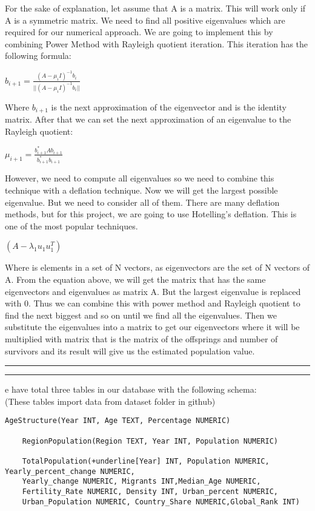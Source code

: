 \documentclass[a4paper, 11pt]{article}
\newcommand{\question}[2] {\vspace{.25in} \hrule\vspace{0.5em}
\noindent{\bf #1: #2} \vspace{0.5em}
\hrule \vspace{.10in}}
\begin{document}
 For the sake of explanation, let assume that A is a matrix. This will work only if A is a symmetric matrix. We need to find all positive eigenvalues which are required for our numerical approach. We are going to implement this by combining Power Method with Rayleigh quotient iteration. This iteration has the following formula:
 \begin{center}
     $b_{i+1} = \frac{(A-\mu_{i}I)^{-1}b_{i}}{||(A-\mu_{i}I)^{-1}b_{i}||} $ 
 \end{center}
Where $b_{i+1}$ is the next approximation of the eigenvector and  is the identity matrix. After that we can set the next approximation of an eigenvalue to the Rayleigh quotient:
 \begin{center}
$\mu_{i+1} = \frac{b^{*}_{i+1}Ab_{i+1}}{b^{*}_{i+1}b_{i+1}}$
 \end{center}
However, we need to compute all eigenvalues so we need to combine this technique with a deflation technique. Now we will get the largest possible eigenvalue. But we need to consider all of them. There are many deflation methods, but for this project, we are going to use Hotelling’s deflation. This is one of the most popular techniques.
 \begin{center}
$(A-\lambda_{1}u_{1}u_{1}^{T})$
\end{center}
Where  is elements in a set of N vectors, as eigenvectors are the set of N vectors of A. From the equation above, we will get the matrix that has the same eigenvectors and eigenvalues as matrix A. But the largest eigenvalue is replaced with 0. Thus we can combine this with power method and Rayleigh quotient to find the next biggest and so on until we find all the eigenvalues. Then we substitute the eigenvalues into a matrix to get our eigenvectors where it will be multiplied with  matrix that is the matrix of the offsprings and number of survivors and its result will give us the estimated population value.\\

\question{Database schema}

We have total three tables in our database with the following schema:\\
(These tables import data from dataset folder in github)
\begin{Verbatim}[commandchars=+\[\]]
    AgeStructure(Year INT, Age TEXT, Percentage NUMERIC)
    
    RegionPopulation(Region TEXT, Year INT, Population NUMERIC)
    
    TotalPopulation(+underline[Year] INT, Population NUMERIC, Yearly_percent_change NUMERIC, 
    Yearly_change NUMERIC, Migrants INT,Median_Age NUMERIC, 
    Fertility_Rate NUMERIC, Density INT, Urban_percent NUMERIC,
    Urban_Population NUMERIC, Country_Share NUMERIC,Global_Rank INT)
\end{Verbatim}
\end{document}
